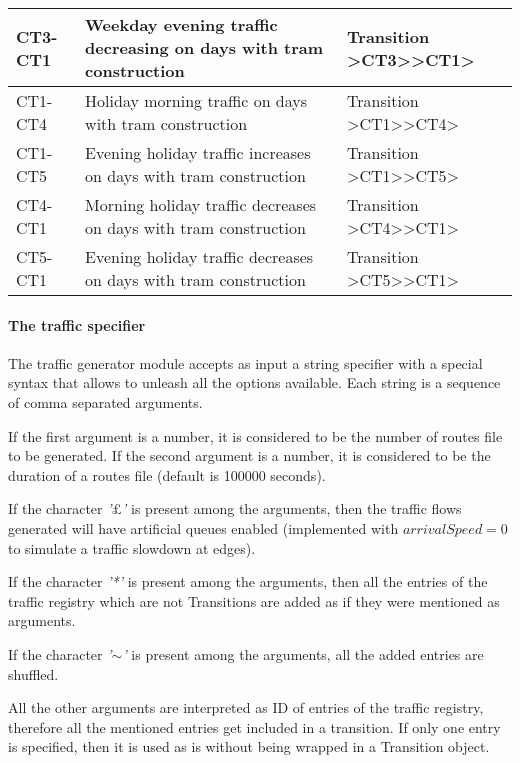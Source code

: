 \begin{table}[H]
{\begin{tabular}{|l|l|l|}
    \hline
    CT3-CT1 & Weekday evening traffic decreasing on days with tram construction                         & Transition >CT3>>CT1> \\
    \hline
    CT1-CT4 & Holiday morning traffic on days with tram construction                                    & Transition >CT1>>CT4> \\
    \hline
    CT1-CT5 & Evening holiday traffic increases on days with tram construction                          & Transition >CT1>>CT5> \\
    \hline
    CT4-CT1 & Morning holiday traffic decreases on days with tram construction                          & Transition >CT4>>CT1> \\
    \hline
    CT5-CT1 & Evening holiday traffic decreases on days with tram construction                          & Transition >CT5>>CT1> \\
    \hline
    \end{tabular}
  }
\end{table}

\paragraph{The traffic specifier}

The traffic generator module accepts as input a string specifier with a special syntax that allows to unleash all the options available.
Each string is a sequence of comma separated arguments.

If the first argument is a number, it is considered to be the number of routes file to be generated.
If the second argument is a number, it is considered to be the duration of a routes file (default is 100000 seconds).

If the character \textit{'$\pounds$'} is present among the arguments, then the traffic flows generated will have artificial queues enabled (implemented with $arrivalSpeed = 0$ to simulate a traffic slowdown at edges).

If the character \textit{'*'} is present among the arguments, then all the entries of the traffic registry which are not Transitions are added as if they were mentioned as arguments.

If the character \textit{'$\sim$'} is present among the arguments, all the added entries are shuffled.

All the other arguments are interpreted as ID of entries of the traffic registry, therefore all the mentioned entries get included in a transition. If only one entry is specified, then it is used as is without being wrapped in a Transition object.

